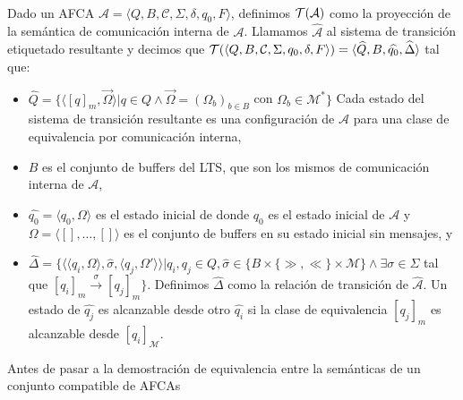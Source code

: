 \begin{definition}\label{def:pci}\ \\
Dado un AFCA $\mathcal{A} = \langle Q, B, \mathcal{C}, \Sigma, \delta, q_0, F \rangle$, definimos $\mathcal{T}(\mathcal{A})$ como la proyección de la semántica de comunicación interna de $\mathcal{A}$. Llamamos $\widehat{\mathcal{A}}$ al sistema de transición etiquetado resultante y decimos que $\mathcal{T} (\langle Q, B, \mathcal{C}, \Sigma, q_0, \delta, F \rangle)= \langle \widehat{Q}, B, \widehat{q_0}, \widehat{\Delta} \rangle$ tal que:
\begin{itemize}
    \item $ \widehat{Q} = \{ \langle [q]_m, \overrightarrow{\Omega} \rangle | q \in Q \land \overrightarrow{\Omega} = (\Omega_b)_{b \in B}$ con $\Omega_b \in \mathcal{M}^* \}$ Cada estado del sistema de transición resultante es una configuración de $\mathcal{A}$ para una clase de equivalencia por comunicación interna,
    \item $B$ es el conjunto de buffers del LTS, que son los mismos de comunicación interna de $\mathcal{A}$,
    \item $\widehat{q_0}= \langle q_0, \Omega \rangle$ es el estado inicial de  donde $q_0$ es el estado inicial de $\mathcal{A}$ y $\Omega = \langle [], \ldots, [] \rangle$ es el conjunto de buffers en su estado inicial sin mensajes, y
    \item $\widehat{\Delta}= \{\langle \langle q_i, \Omega \rangle, \widehat{\sigma},\langle q_j, \Omega' \rangle \rangle | q_i, q_j \in Q, \widehat{\sigma} \in \{B \times \{\gg, \ll\} \times \mathcal{M}\} \land \exists \sigma \in \Sigma$ tal que  $[q_i]_m \xrightarrow{\sigma} [q_j]_m \}$. Definimos $\widehat{\Delta}$ como la relación de transición de $\widehat{\mathcal{A}}$. Un estado de $\widehat{q_j}$ es alcanzable desde otro $\widehat{q_i}$ si la clase de equivalencia $[q_j]_m$ es alcanzable desde $[q_i]_\mathcal{M}$.
\end{itemize}
\end{definition}

Antes de pasar a la demostración de equivalencia entre la semánticas de un conjunto compatible de AFCAs

